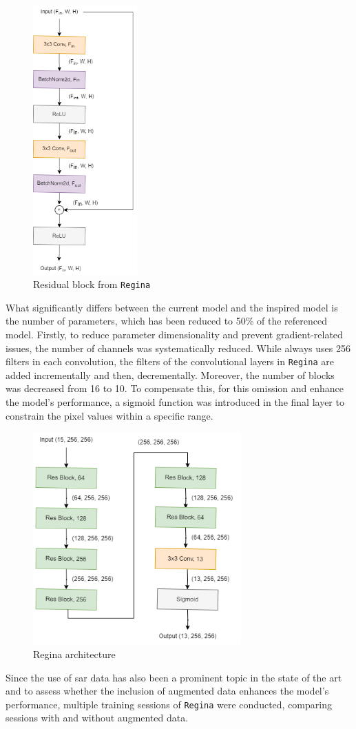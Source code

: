 \begin{figure}[H]
	\centering
	\includegraphics[width=4cm]{imgs/models/models/cnn/ResBlock.png}
	\caption{Residual block from \texttt{Regina}}
	\label{fig:residual-block-regina2}
\end{figure}
What significantly differs between the current model and the inspired model is the number of parameters, which has been reduced to 50\% of the referenced model. Firstly, to reduce parameter dimensionality and prevent gradient-related issues, the number of channels was systematically reduced. While \cite{Meraner2020} always uses 256 filters in each convolution, the filters of the convolutional layers in \texttt{Regina} are added incrementally and then, decrementally. Moreover, the number of blocks was decreased from 16 to 10. To compensate this, for this omission and enhance the model's performance, a sigmoid function was introduced in the final layer to constrain the pixel values within a specific range. 
\begin{figure}[H]
	\centering
	\includegraphics[width=8cm]{imgs/models/models/cnn/Regina.png}
	\caption{Regina architecture }
	\label{fig:residual-block-regina}
\end{figure}
Since the use of \gls{sar} data has also been a prominent topic in the state of the art and to assess whether the inclusion of augmented data enhances the model's performance, multiple training sessions of \texttt{Regina} were conducted, comparing sessions with and without augmented data.

